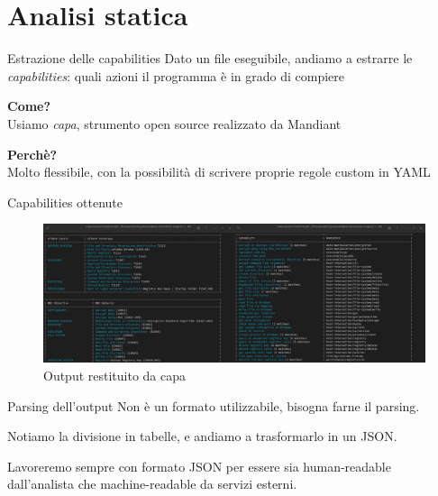 \section{Analisi statica}

\begin{frame}{Estrazione delle capabilities}
Dato un file eseguibile, andiamo a estrarre le \emph{capabilities}: quali azioni il programma è in grado di compiere

\vfill

\textbf{Come?} \\
Usiamo \emph{capa}, strumento open source realizzato da Mandiant

\vfill

\textbf{Perchè?} \\
Molto flessibile, con la possibilità di scrivere proprie regole custom in YAML
\end{frame}

\begin{frame}{Capabilities ottenute}
\begin{figure}
    \centering
    \includegraphics[width=\textwidth]{images/capa_example_invocation.png}
    \caption{Output restituito da capa}
    \label{fig:capa_example_invocation}
\end{figure}
\end{frame}

\begin{frame}{Parsing dell'output}
Non è un formato utilizzabile, bisogna farne il parsing.

\vfill

Notiamo la divisione in tabelle, e andiamo a trasformarlo in un JSON.

Lavoreremo sempre con formato JSON per essere sia human-readable dall'analista che machine-readable da servizi esterni.
\end{frame}

